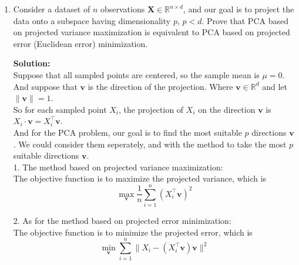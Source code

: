 \documentclass[10pt]{article}
\begin{document}
\begin{enumerate}[1.]
\newpage 
    \item {} Consider a dataset of $n$ observations $\mathbf{X}\in         \mathbb{R}^{n \times d}$, and our goal is to project the data onto a           subspace having dimensionality $p$, $p<d$. 
	Prove that PCA based on projected variance maximization is equivalent to       PCA based on projected error (Euclidean error) minimization. \par
\textbf{Solution:}\\
Suppose that all sampled points are centered, so the sample mean is $\mu=0$.\\
And suppose that $\mathbf{v}$ is the direction of the projection. Where $\mathbf{v}\in \mathbb{R}^d$ and let $\|\mathbf{v}\|=1$.\\
So for each sampled point $X_i$, the projection of $X_i$ on the direction $\mathbf{v}$ is $X_i\cdot \mathbf{v}=X_i^{\top}\mathbf{v}$.\\
And for the PCA problem, our goal is to find the most suitable $p$ directions $\mathbf{v}$.
We could consider them seperately, and with the method to take the most $p$ suitable directions $\mathbf{v}$.\\

1. The method based on projected variance maximization:\\
The objective function is to maximize the projected variance, which is
$$\max_{\mathbf{v}} \dfrac{1}{n}\sum\limits_{i=1}^n (X_i^{\top}\mathbf{v})^2$$
 


2. As for the method based on projected error minimization:\\
The objective function is to minimize the projected error, which is
$$\min_{\mathbf{v}} \sum\limits_{i=1}^n \|X_i-(X_i^{\top}\mathbf{v})\mathbf{v}\|^2$$


\end{enumerate}
\end{document}
